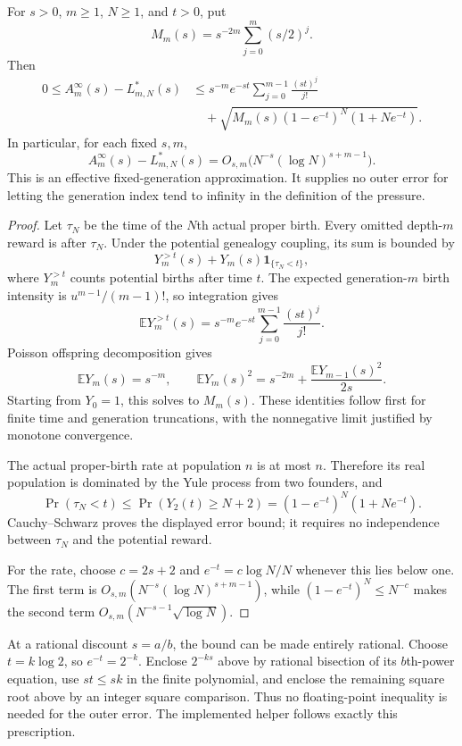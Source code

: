 \begin{proposition}
\label{pop:tail}
For $s>0$, $m\ge1$, $N\ge1$, and $t>0$, put
\[
 M_m(s)=s^{-2m}\sum_{j=0}^{m}(s/2)^j.
\]
Then
\begin{align*}
0\le A_m^\infty(s)-L^*_{m,N}(s)
&\le s^{-m}e^{-st}\sum_{j=0}^{m-1}\frac{(st)^j}{j!}\\
&\quad+
\sqrt{M_m(s)(1-e^{-t})^N(1+Ne^{-t})}.
\end{align*}
In particular, for each fixed $s,m$,
\[
 A_m^\infty(s)-L^*_{m,N}(s)
 =O_{s,m}\bigl(N^{-s}(\log N)^{s+m-1}\bigr).
\]
This is an effective fixed-generation approximation. It supplies no
outer error for letting the generation index tend to infinity in the
definition of the pressure.
\end{proposition}
\begin{proof}
Let $\tau_N$ be the time of the $N$th actual proper birth. Every
omitted depth-$m$ reward is after $\tau_N$. Under the potential
genealogy coupling, its sum is bounded by
\[
 Y_m^{>t}(s)+Y_m(s)\mathbf1_{\{\tau_N<t\}},
\]
where $Y_m^{>t}$ counts potential births after time $t$.
The expected generation-$m$ birth intensity is
$u^{m-1}/(m-1)!$, so integration gives
\[
 \mathbb E Y_m^{>t}(s)
 =s^{-m}e^{-st}\sum_{j=0}^{m-1}\frac{(st)^j}{j!}.
\]
Poisson offspring decomposition gives
\[
 \mathbb E Y_m(s)=s^{-m},\qquad
 \mathbb E Y_m(s)^2
 =s^{-2m}+\frac{\mathbb E Y_{m-1}(s)^2}{2s}.
\]
Starting from $Y_0=1$, this solves to $M_m(s)$. These identities
follow first for finite time and generation truncations, with the
nonnegative limit justified by monotone convergence.

The actual proper-birth rate at population $n$ is at most $n$.
Therefore its real population is dominated by the Yule process from
two founders, and
\[
 \Pr(\tau_N<t)
 \le\Pr(Y_2(t)\ge N+2)
 =(1-e^{-t})^N(1+Ne^{-t}).
\]
Cauchy--Schwarz proves the displayed error bound; it requires no
independence between $\tau_N$ and the potential reward.

For the rate, choose $c=2s+2$ and
$e^{-t}=c\log N/N$ whenever this lies below one. The first term is
$O_{s,m}(N^{-s}(\log N)^{s+m-1})$, while
$(1-e^{-t})^N\le N^{-c}$ makes the second term
$O_{s,m}(N^{-s-1}\sqrt{\log N})$.
\end{proof}

At a rational discount $s=a/b$, the bound can be made entirely
rational. Choose $t=k\log2$, so $e^{-t}=2^{-k}$. Enclose
$2^{-ks}$ above by rational bisection of its $b$th-power equation,
use $st\le sk$ in the finite polynomial, and enclose the remaining
square root above by an integer square comparison. Thus no
floating-point inequality is needed for the outer error. The
implemented helper follows exactly this prescription.

